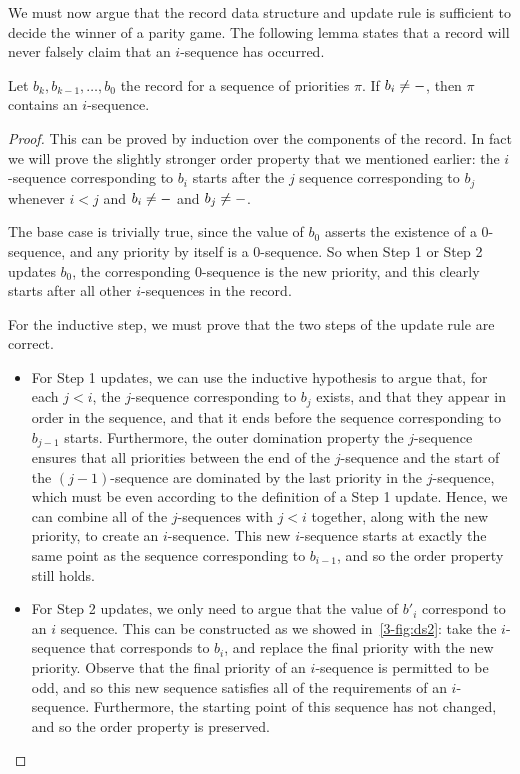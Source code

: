 We must now argue that the record data structure and update rule is sufficient
to decide the winner of a parity game. The following lemma states that a record
will never falsely claim that an $i$-sequence has occurred.

\begin{lemma}
Let $b_k, b_{k-1}, \dots, b_0$ the record for a sequence of priorities $\pi$.
If $b_i \ne \mathtt{-}$, then $\pi$ contains an $i$-sequence.
\end{lemma}
\begin{proof}
This can be proved by induction over the components of the record. In fact we
will prove the slightly stronger order property that we mentioned earlier:
the $i$-sequence corresponding to
$b_i$ starts after the $j$ sequence corresponding to $b_j$ whenever $i < j$ and
$b_i \ne \mathtt{-}$ and $b_j \ne \mathtt{-}$.

The base case is trivially true, since the value of $b_0$ asserts the existence
of a 0-sequence, and any priority by itself is a $0$-sequence. So when Step 1 or
Step 2 updates $b_0$, the corresponding $0$-sequence is the new priority, and
this clearly starts after all other $i$-sequences in the record.

For the inductive step, we must prove that the two steps of the update rule are
correct. 
\begin{itemize}
\item For Step 1 updates, we can use the inductive hypothesis to argue that, for
each $j < i$, the $j$-sequence corresponding to $b_j$ exists, and that they
appear in order in the sequence, and that it ends before the sequence
corresponding to $b_{j-1}$ starts. Furthermore, the outer domination property
the $j$-sequence ensures that all priorities between the end of the
$j$-sequence and the start of the $(j-1)$-sequence are dominated by the last
priority in the $j$-sequence, which must be even according to the definition of
a Step 1 update.
Hence, we can combine all of the $j$-sequences with $j < i$ together, along with
the new priority, to create an $i$-sequence. This new $i$-sequence starts at
exactly the same point as the sequence corresponding to $b_{i-1}$, and so the
order property still holds.

\item For Step 2 updates, we only need to argue that the value of $b'_i$
correspond to an $i$ sequence. This can be constructed as we showed in~\cref{3-fig:ds2}: 
take the $i$-sequence that corresponds to $b_i$, and
replace the final priority with the new priority. Observe that the final
priority of an $i$-sequence is permitted to be odd, and so this new sequence
satisfies all of the requirements of an $i$-sequence. Furthermore, the starting
point of this sequence has not changed, and so the order property is preserved.
\end{itemize}
\end{proof}

